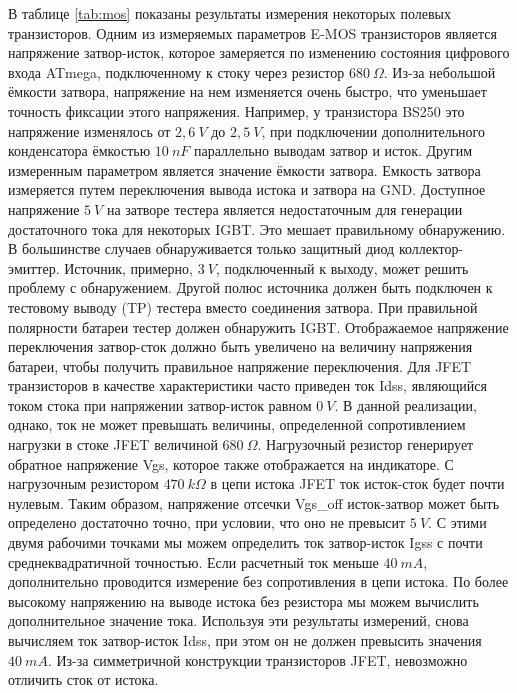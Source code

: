 В таблице \ref{tab:mos} показаны результаты измерения некоторых полевых транзисторов. Одним из измеряемых параметров 
E-MOS транзисторов является напряжение затвор-исток, которое замеряется по изменению состояния цифрового входа ATmega, 
подключенному 
к стоку через резистор \(680~\Omega\).
Из-за небольшой ёмкости затвора, напряжение на нем изменяется
очень быстро, что уменьшает точность фиксации этого напряжения. Например, у транзистора BS250 это напряжение
изменялось от \(2,6~V\) до \(2,5~V\), при подключении дополнительного конденсатора ёмкостью
\(10~nF\) параллельно выводам затвор и исток.
Другим измеренным параметром является значение ёмкости затвора.
Емкость затвора измеряется путем переключения вывода истока и затвора на GND.
Доступное напряжение \(5~V\) на затворе тестера является недостаточным для генерации достаточного тока
для некоторых IGBT. Это мешает правильному обнаружению.
В большинстве случаев обнаруживается только защитный диод коллектор-эмиттер.
Источник, примерно, \(3~V\), подключенный к выходу, может решить проблему с обнаружением.
Другой полюс источника должен быть подключен к тестовому выводу (TP) тестера вместо соединения затвора.
При правильной полярности батареи тестер должен обнаружить IGBT.
Отображаемое напряжение переключения затвор-сток должно быть увеличено на величину напряжения батареи,
чтобы получить правильное напряжение переключения.
Для JFET транзисторов в качестве характеристики часто приведен ток Idss,
являющийся током стока при напряжении затвор-исток равном \(0~V\). В данной реализации, однако, ток не может
превышать величины, определенной сопротивлением нагрузки в стоке JFET величиной \(680~\Omega\).
Нагрузочный резистор генерирует обратное напряжение Vgs, которое также отображается на индикаторе.
С нагрузочным резистором \(470~k\Omega\) в цепи истока JFET ток исток-сток будет почти нулевым.
Таким образом, напряжение отсечки Vgs\_off исток-затвор может быть определено достаточно точно,
при условии, что оно не превысит \(5~V\).
С этими двумя рабочими точками мы можем определить ток затвор-исток Igss с почти среднеквадратичной точностью.
Если расчетный ток меньше \(40~mA\), дополнительно проводится измерение без сопротивления в цепи истока.
По более высокому напряжению на выводе истока без резистора мы можем вычислить дополнительное значение тока.
Используя эти результаты измерений, снова вычисляем ток затвор-исток Idss,
при этом он не должен превысить значения \(40~mA\).
Из-за симметричной конструкции транзисторов JFET, невозможно отличить сток от истока.


